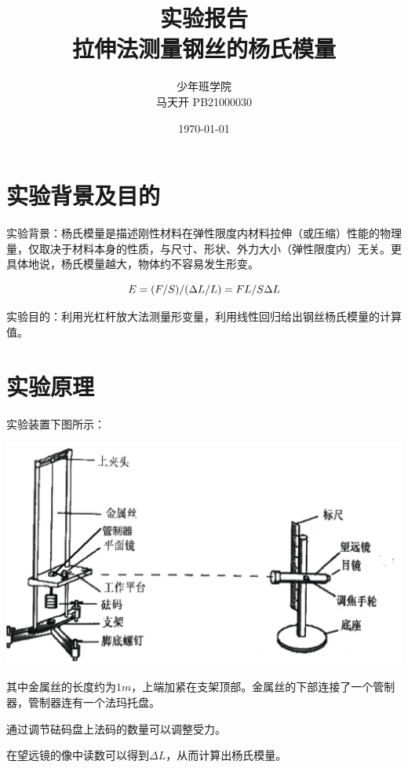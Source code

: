 \documentclass[a4paper]{ltxdoc}
\title {实验报告\\拉伸法测量钢丝的杨氏模量}
\author {少年班学院\\马天开 PB21000030}
\date {\today}
\newenvironment{Figure}
  {\par\medskip\noindent\minipage{\linewidth}}
  {\endminipage\par\medskip}
\begin{document}
\begin{multicols}{2}
    \maketitle

    \section{实验背景及目的}

    实验背景：杨氏模量是描述刚性材料在弹性限度内材料拉伸（或压缩）性能的物理量，仅取决于材料本身的性质，与尺寸、形状、外力大小（弹性限度内）无关。更具体地说，杨氏模量越大，物体约不容易发生形变。

    \begin{equation}
        E = (F/S) / (\Delta L / L) = FL/S\Delta L
        \notag
    \end{equation}

    实验目的：利用光杠杆放大法测量形变量，利用线性回归给出钢丝杨氏模量的计算值。

    \section{实验原理}

    实验装置下图所示：

    \begin{Figure}
        \centering
        \includegraphics[width=\linewidth]{img/1.png}
    \end{Figure}

    其中金属丝的长度约为$1m$，上端加紧在支架顶部。金属丝的下部连接了一个管制器，管制器连有一个法玛托盘。

    通过调节砝码盘上法码的数量可以调整受力。

    在望远镜的像中读数可以得到$\Delta L$，从而计算出杨氏模量。


\end{multicols}
\end{document}
